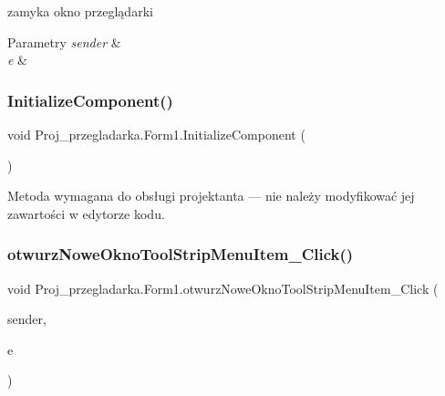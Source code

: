 zamyka okno przeglądarki 


\begin{DoxyParams}{Parametry}
{\em sender} & \\
\hline
{\em e} & \\
\hline
\end{DoxyParams}
\mbox{\label{class_proj__przegladarka_1_1_form1_a2fc892b8bc9dc90f327be70082d9c7a0}} 
\subsubsection{\texorpdfstring{InitializeComponent()}{InitializeComponent()}}
{\footnotesize\ttfamily void Proj\+\_\+przegladarka.\+Form1.\+Initialize\+Component (\begin{DoxyParamCaption}{ }\end{DoxyParamCaption})\hspace{0.3cm}{\ttfamily [private]}}



Metoda wymagana do obsługi projektanta — nie należy modyfikować jej zawartości w edytorze kodu. 

\mbox{\label{class_proj__przegladarka_1_1_form1_ae9fab4c2fdb6d2088e564c3accefe0af}} 
\subsubsection{\texorpdfstring{otwurzNoweOknoToolStripMenuItem\_Click()}{otwurzNoweOknoToolStripMenuItem\_Click()}}
{\footnotesize\ttfamily void Proj\+\_\+przegladarka.\+Form1.\+otwurz\+Nowe\+Okno\+Tool\+Strip\+Menu\+Item\+\_\+\+Click (\begin{DoxyParamCaption}\item[{object}]{sender,  }\item[{Event\+Args}]{e }\end{DoxyParamCaption})\hspace{0.3cm}{\ttfamily [private]}}



